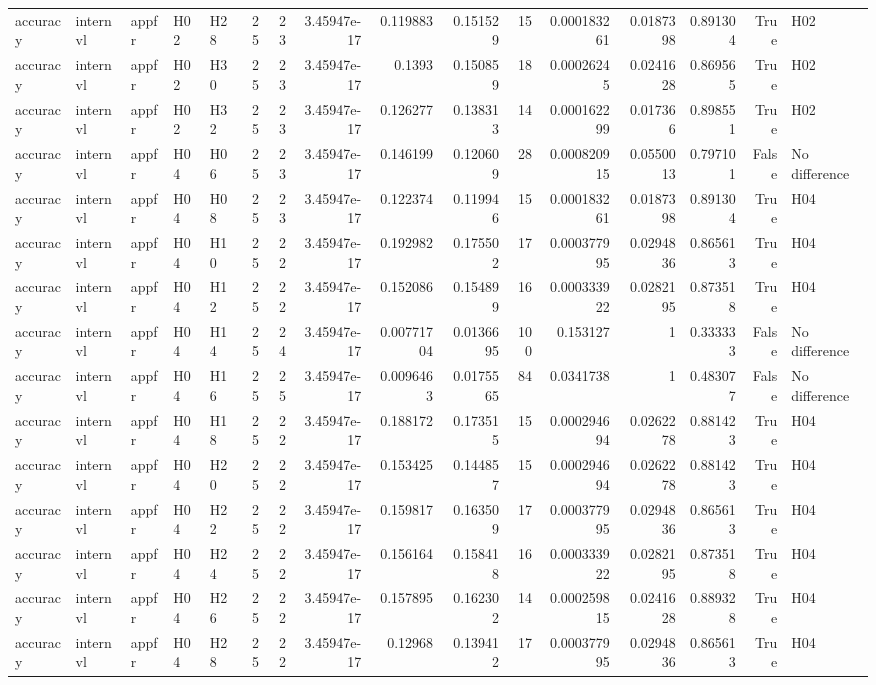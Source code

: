\begin{longtable}{lllllrrrrrrrrrrl}
accuracy & internvl & appfr & H02 & H28 & 25 & 23 & 3.45947e-17 & 0.119883 & 0.151529 & 15 & 0.000183261 & 0.0187398 & 0.891304 & True & H02 \\
accuracy & internvl & appfr & H02 & H30 & 25 & 23 & 3.45947e-17 & 0.1393 & 0.150859 & 18 & 0.00026245 & 0.0241628 & 0.869565 & True & H02 \\
accuracy & internvl & appfr & H02 & H32 & 25 & 23 & 3.45947e-17 & 0.126277 & 0.138313 & 14 & 0.000162299 & 0.017366 & 0.898551 & True & H02 \\
accuracy & internvl & appfr & H04 & H06 & 25 & 23 & 3.45947e-17 & 0.146199 & 0.120609 & 28 & 0.000820915 & 0.0550013 & 0.797101 & False & No difference \\
accuracy & internvl & appfr & H04 & H08 & 25 & 23 & 3.45947e-17 & 0.122374 & 0.119946 & 15 & 0.000183261 & 0.0187398 & 0.891304 & True & H04 \\
accuracy & internvl & appfr & H04 & H10 & 25 & 22 & 3.45947e-17 & 0.192982 & 0.175502 & 17 & 0.000377995 & 0.0294836 & 0.865613 & True & H04 \\
accuracy & internvl & appfr & H04 & H12 & 25 & 22 & 3.45947e-17 & 0.152086 & 0.154899 & 16 & 0.000333922 & 0.0282195 & 0.873518 & True & H04 \\
accuracy & internvl & appfr & H04 & H14 & 25 & 24 & 3.45947e-17 & 0.00771704 & 0.0136695 & 100 & 0.153127 & 1 & 0.333333 & False & No difference \\
accuracy & internvl & appfr & H04 & H16 & 25 & 25 & 3.45947e-17 & 0.0096463 & 0.0175565 & 84 & 0.0341738 & 1 & 0.483077 & False & No difference \\
accuracy & internvl & appfr & H04 & H18 & 25 & 22 & 3.45947e-17 & 0.188172 & 0.173515 & 15 & 0.000294694 & 0.0262278 & 0.881423 & True & H04 \\
accuracy & internvl & appfr & H04 & H20 & 25 & 22 & 3.45947e-17 & 0.153425 & 0.144857 & 15 & 0.000294694 & 0.0262278 & 0.881423 & True & H04 \\
accuracy & internvl & appfr & H04 & H22 & 25 & 22 & 3.45947e-17 & 0.159817 & 0.163509 & 17 & 0.000377995 & 0.0294836 & 0.865613 & True & H04 \\
accuracy & internvl & appfr & H04 & H24 & 25 & 22 & 3.45947e-17 & 0.156164 & 0.158418 & 16 & 0.000333922 & 0.0282195 & 0.873518 & True & H04 \\
accuracy & internvl & appfr & H04 & H26 & 25 & 22 & 3.45947e-17 & 0.157895 & 0.162302 & 14 & 0.000259815 & 0.0241628 & 0.889328 & True & H04 \\
accuracy & internvl & appfr & H04 & H28 & 25 & 22 & 3.45947e-17 & 0.12968 & 0.139412 & 17 & 0.000377995 & 0.0294836 & 0.865613 & True & H04 \\

\end{longtable}
